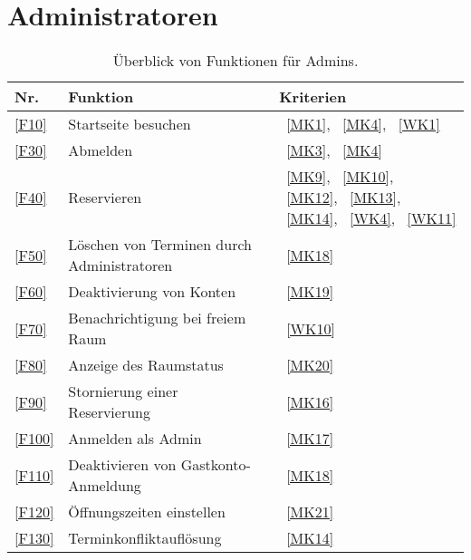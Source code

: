 \section{Administratoren}\label{sec:adminfunktionen}

\begin{table}[htbp]
    \centering
    \begin{tabularx}{\textwidth}{ l|X|>{\raggedright\arraybackslash}X  }
        \textbf{Nr.} & \textbf{Funktion} & \textbf{Kriterien} \\ \hline\hline
        \ref{F10} & Startseite besuchen &~\ref{MK1}, ~\ref{MK4}, ~\ref{WK1} \\
        \ref{F30} & Abmelden &~\ref{MK3}, ~\ref{MK4} \\
        \ref{F40} & Reservieren &~\ref{MK9}, ~\ref{MK10}, ~\ref{MK12}, ~\ref{MK13}, ~\ref{MK14}, ~\ref{WK4}, ~\ref{WK11} \\
        \ref{F50} & Löschen von Terminen durch Administratoren &~\ref{MK18} \\
        \ref{F60} & Deaktivierung von Konten &~\ref{MK19} \\
        \ref{F70} & Benachrichtigung bei freiem Raum &~\ref{WK10} \\
        \ref{F80} & Anzeige des Raumstatus &~\ref{MK20} \\
        \ref{F90} & Stornierung einer Reservierung &~\ref{MK16} \\
        \ref{F100} & Anmelden als Admin &~\ref{MK17} \\
        \ref{F110} & Deaktivieren von Gastkonto-Anmeldung &~\ref{MK18} \\
        \ref{F120} & Öffnungszeiten einstellen &~\ref{MK21} \\
        \ref{F130} & Terminkonfliktauflösung &~\ref{MK14} \\
    \end{tabularx}
    \caption{Überblick von Funktionen für Admins.}
    \label{tab:adminfunctions}
\end{table}



